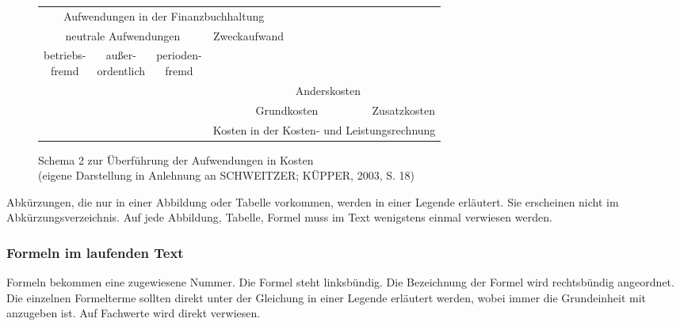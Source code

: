 \begin{figure}[H]
    \begin{tabularx}{\columnwidth}{cccccc}
        \cline{1-4}
        \multicolumn{4}{|c|}{Aufwendungen in der Finanzbuchhaltung} & & \\
        \cline{1-4}
        \multicolumn{3}{|c|}{neutrale Aufwendungen} & \multicolumn{1}{c|}{\multirow{3}{*}{Zweckaufwand}} & \\
        \multicolumn{1}{|c}{\multirow{2}{*}{\parbox{2cm}{betriebs-\\fremd}}} & \multicolumn{1}{|c}{\multirow{2}{*}{\parbox{2cm}{außer-\\ordentlich}}} & \multicolumn{1}{|c}{\multirow{2}{*}{\parbox{2cm}{perioden-\\fremd}}} & \multicolumn{1}{|c|}{\multirow{2}{*}{}} & & \\
        \multicolumn{1}{|c}{} & \multicolumn{1}{|c}{} & \multicolumn{1}{|c|}{} & \multicolumn{1}{c|}{} & & \\
        \cline{1-6}
        & & & \multicolumn{1}{|c}{} & \multicolumn{1}{|c|}{Anderskosten} &\multicolumn{1}{c|}{} \\
        \cline{5-5}
        & & & \multicolumn{2}{|c|}{Grundkosten} &  \multicolumn{1}{|c|}{Zusatzkosten} \\
        \cline{4-6}
        & & & \multicolumn{3}{|c|}{Kosten in der Kosten- und Leistungsrechnung}\\
        \cline{4-6}
    \end{tabularx}
    \caption{\small Schema 2 zur Überführung der Aufwendungen in Kosten\\(eigene Darstellung in Anlehnung an SCHWEITZER; KÜPPER, 2003, S. 18)\normalsize}
    \label{fig-schema2}
\end{figure}

Abkürzungen, die nur in einer Abbildung oder Tabelle vorkommen, werden in einer Legende erläutert.
Sie erscheinen nicht im Abkürzungsverzeichnis.
Auf jede Abbildung, Tabelle, Formel muss im Text wenigstens einmal verwiesen werden.

\subsubsection{Formeln im laufenden Text}
\label{formal-gestaltung-textteil-formeln-fliesstext}
Formeln bekommen eine zugewiesene Nummer.
Die Formel steht linksbündig.
Die Bezeichnung der Formel wird rechtsbündig angeordnet.
Die einzelnen Formelterme sollten direkt unter der Gleichung in einer Legende erläutert werden, wobei immer die Grundeinheit mit anzugeben ist.
Auf Fachwerte wird direkt verwiesen.

